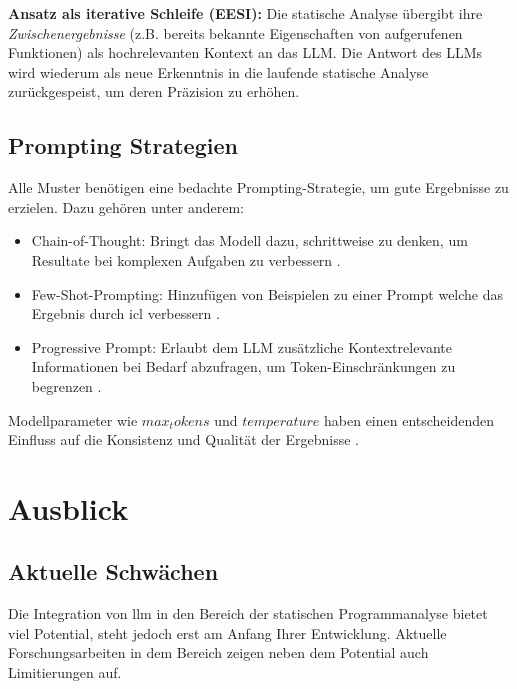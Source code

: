 \documentclass[%
    paper=A4,               %
    ngerman,
    parskip=half,           %
    11pt,                   %
    headings=normal,        %
    bibliography=totoc,     %
    listof=totoc,           %
    chapterprefix=false,    %
    appendixprefix=false,    %
    draft=false,            %
]{scrartcl}%
\begin{document}
\textbf{Ansatz als iterative Schleife (EESI):} Die statische Analyse übergibt ihre \textit{Zwischenergebnisse} (z.B. bereits bekannte Eigenschaften von aufgerufenen Funktionen) als hochrelevanten Kontext an das LLM. Die Antwort des LLMs wird wiederum als neue Erkenntnis in die laufende statische Analyse zurückgespeist, um deren Präzision zu erhöhen\cite{chapmanInterleavingStaticAnalysis2024}.


\subsection{Prompting Strategien}

Alle Muster benötigen eine bedachte Prompting-Strategie, um gute Ergebnisse zu erzielen. Dazu gehören unter anderem:

\begin{itemize}

\item Chain-of-Thought: Bringt das Modell dazu, schrittweise zu denken, um Resultate bei komplexen Aufgaben zu verbessern \cite{liEnhancingStaticAnalysis2024}.
\item Few-Shot-Prompting: Hinzufügen von Beispielen zu einer Prompt welche das  Ergebnis durch \ac{icl} verbessern \cite{khareUnderstandingEffectivenessLarge2024}.
\item Progressive Prompt: Erlaubt dem LLM zusätzliche Kontextrelevante Informationen bei Bedarf abzufragen, um Token-Einschränkungen zu begrenzen \cite{liEnhancingStaticAnalysis2024}.

\end{itemize}

Modellparameter wie $max_tokens$ und $temperature$ haben einen entscheidenden Einfluss auf die Konsistenz und Qualität der Ergebnisse \cite{wagnerEffectiveComplementarySecurity2025}.


\section{Ausblick}

\subsection{Aktuelle Schwächen}

Die Integration von \ac{llm} in den Bereich der statischen Programmanalyse bietet viel Potential, steht jedoch erst am Anfang Ihrer Entwicklung. Aktuelle Forschungsarbeiten in dem Bereich zeigen neben dem Potential auch Limitierungen auf.
\end{document}
